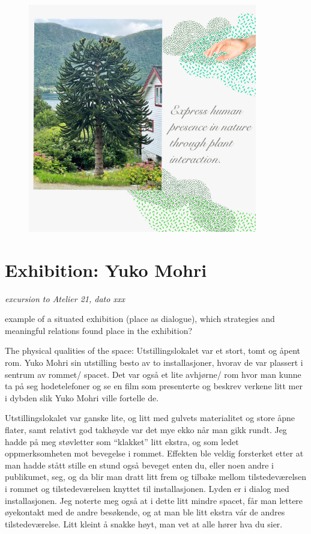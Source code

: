 \begin{figure}[H]
\includegraphics[width=10cm]{pictures/human_presence.jpg}
\centering 
\end{figure}


\section{Exhibition: Yuko Mohri}
\par
\emph{excursion to Atelier 21, dato xxx}
\par

example of a situated exhibition (place as dialogue),
which strategies and meaningful relations found place in the exhibition?


The physical qualities of the space:
Utstillingslokalet var et stort, tomt og åpent rom. Yuko Mohri sin utstilling besto av to installasjoner, hvorav de var plassert i sentrum av rommet/ spacet.  Det var også et lite avhjørne/ rom hvor man kunne ta på seg hodetelefoner og se en film som presenterte og beskrev verkene litt mer i dybden slik Yuko Mohri ville fortelle de.

Utstillingslokalet var ganske lite, og litt med gulvets materialitet og store åpne flater, samt relativt god takhøyde var det mye ekko når man gikk rundt. Jeg hadde på meg støvletter som “klakket” litt ekstra, og som ledet oppmerksomheten mot bevegelse i rommet. Effekten ble veldig forsterket etter at man hadde stått stille en stund også beveget enten du, eller noen andre i publikumet, seg, og da blir man dratt litt frem og tilbake mellom tilstedeværelsen i rommet og tilstedeværelsen knyttet til installasjonen. Lyden er i dialog med installasjonen. 
Jeg noterte meg også at i dette litt mindre spacet, får man lettere øyekontakt med de andre besøkende, og at man ble litt ekstra vár de andres tilstedeværelse. Litt kleint å snakke høyt, man vet at alle hører hva du sier.

